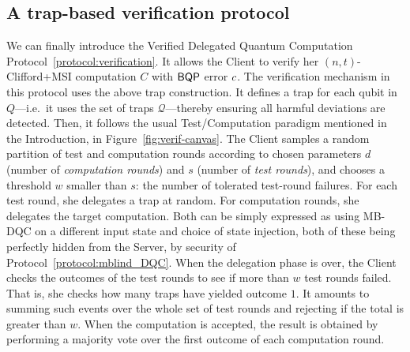 \subsection{A trap-based verification protocol}
\label{subsection:verification:protocol}
We can finally introduce the Verified Delegated Quantum Computation Protocol~\ref{protocol:verification}.
It allows the Client to verify her $(n,t)$-Clifford+MSI computation $C$ with $\textsf{BQP}$ error $c$.
The verification mechanism in this protocol uses the above trap construction. It defines a trap for each qubit in $Q$---i.e.~it uses the set of traps $\mathcal Q$---thereby ensuring all harmful deviations are detected.
Then, it follows the usual Test/Computation paradigm mentioned in the Introduction, in Figure~\ref{fig:verif-canvas}. The Client samples a random partition of test and computation rounds according to chosen parameters $d$ (number of \emph{computation rounds}) and $s$ (number of \emph{test rounds}), and chooses a threshold $w$ smaller than $s$: the number of tolerated test-round failures. For each test round, she delegates a trap at random. For computation rounds, she delegates the target computation. Both can be simply expressed as using MB-DQC on a different input state and choice of state injection, both of these being perfectly hidden from the Server, by security of Protocol~\ref{protocol:mblind_DQC}. When the delegation phase is over, the Client checks the outcomes of the test rounds to see if more than $w$ test rounds failed. That is, she checks how many traps have yielded outcome $1$. It amounts to summing such events over the whole set of test rounds and rejecting if the total is greater than $w$. When the computation is accepted, the result is obtained by performing a majority vote over the first outcome of each computation round.

